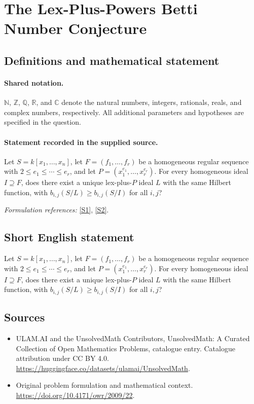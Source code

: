 \documentclass[11pt]{article}
\newcommand{\sref}[2]{\hyperlink{source:#1:#2}{[S#2]}}
\begin{document}
\section{The Lex-Plus-Powers Betti Number Conjecture}\label{statement}

\subsection{Definitions and mathematical statement}

\paragraph{Shared notation.}$\mathbb N$, $\mathbb Z$, $\mathbb Q$, $\mathbb R$, and $\mathbb C$ denote the natural numbers, integers, rationals, reals, and complex numbers, respectively. All additional parameters and hypotheses are specified in the question.


\paragraph{Statement recorded in the supplied source.}
Let $S=k[x_1,\ldots,x_n]$, let $F=(f_1,\ldots,f_r)$ be a homogeneous regular sequence with $2\leq e_1\leq\cdots\leq e_r$, and let $P=(x_1^{e_1},\ldots,x_r^{e_r})$. For every homogeneous ideal $I\supseteq F$, does there exist a unique lex-plus-$P$ ideal $L$ with the same Hilbert function, with $b_{i,j}(S/L)\geq b_{i,j}(S/I)$ for all $i,j$?
\par\smallskip\textit{Formulation references:} \sref{statement}{1}, \sref{statement}{2}.
\subsection{Short English statement}
Let $S=k[x_1,\ldots,x_n]$, let $F=(f_1,\ldots,f_r)$ be a homogeneous regular sequence with $2\leq e_1\leq\cdots\leq e_r$, and let $P=(x_1^{e_1},\ldots,x_r^{e_r})$. For every homogeneous ideal $I\supseteq F$, does there exist a unique lex-plus-$P$ ideal $L$ with the same Hilbert function, with $b_{i,j}(S/L)\geq b_{i,j}(S/I)$ for all $i,j$?
\subsection{Sources}
\begin{itemize}
\item[\hypertarget{source:statement:1}{S1}] ULAM.AI and the UnsolvedMath Contributors, UnsolvedMath: A Curated Collection of Open Mathematics Problems, catalogue entry. Catalogue attribution under CC BY 4.0.
\url{https://huggingface.co/datasets/ulamai/UnsolvedMath}.
\item[\hypertarget{source:statement:2}{S2}] Original problem formulation and mathematical context.
\url{https://doi.org/10.4171/owr/2009/22}.
\end{itemize}
\label{end:statement}
\end{document}
